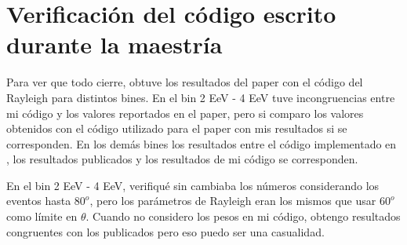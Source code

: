 \section{Verificación del código escrito durante la maestría}

Para ver que todo cierre, obtuve los resultados del paper \cite{Aab_2020} con el código del Rayleigh para distintos bines. En el bin  2 EeV - 4 EeV  tuve incongruencias entre mi código y los valores reportados en el paper, pero si comparo los valores obtenidos con el código utilizado para el paper con mis resultados si se corresponden. En los demás bines los resultados entre el código implementado en \cite{Aab_2020}, los resultados publicados y los resultados de mi código se corresponden.


En el bin 2 EeV - 4 EeV, verifiqué sin cambiaba los números considerando los eventos hasta $80^o$, pero los parámetros de Rayleigh eran los mismos que usar $60^o$  como límite en $\theta$.  Cuando no considero los pesos en mi código, obtengo resultados congruentes con los publicados pero eso puedo ser una casualidad.

